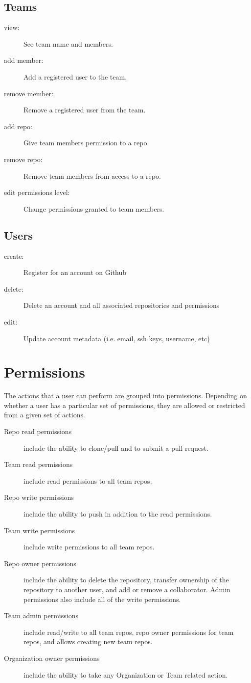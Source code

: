 \documentclass[11pt]{article}
\begin{document}
\subsection*{Teams}
\begin{description}
\item[view:]
See team name and members.
\item[add member:]
Add a registered user to the team.
\item[remove member:]
Remove a registered user from the team.
\item[add repo:]
Give team members permission to a repo.
\item[remove repo:]
Remove team members from access to a repo.
\item[edit permissions level:]
Change permissions granted to team members.
\end{description}

\subsection*{Users}
\begin{description}
\item[create:]
Register for an account on Github
\item[delete:]
Delete an account and all associated repositories and permissions
\item[edit:]
Update account metadata (i.e. email, ssh keys, username, etc)
\end{description}

\section*{Permissions}
The actions that a user can perform are grouped into permissions. Depending on whether a user has a particular set of permissions, they are allowed or restricted from a given set of actions.
\begin{description}
\item[Repo read permissions] include the ability to clone/pull and to submit a pull request.
\item[Team read permissions] include read permissions to all team repos.
\item[Repo write permissions] include the ability to push in addition to the read permissions.
\item[Team write permissions] include write permissions to all team repos.
\item[Repo owner permissions] include the ability to delete the repository, transfer ownership of the repository to another user, and add or remove a collaborator. Admin permissions also include all of the write permissions.
\item[Team admin permissions] include read/write to all team repos, repo owner permissions for team repos, and allows creating new team repos.
\item[Organization owner permissions] include the ability to take any Organization or Team related action.
\end{description}
\end{document}
